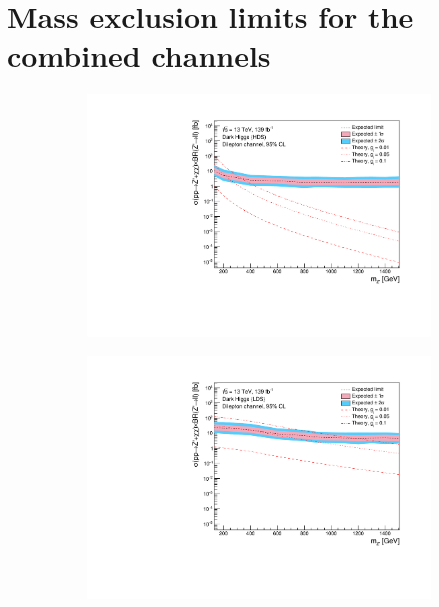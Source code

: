 \documentclass[12pt, a4paper]{book}
\begin{document}
\section{Mass exclusion limits for the combined channels}
\begin{figure}[!ht]
	\centering
	\begin{subfigure}[b]{0.49\textwidth}
      \centering
      \includegraphics[width=1\textwidth]{Limits/DH_HDS/mass_exclusion_comb.pdf}
   \end{subfigure}
   \hfill
   \begin{subfigure}[b]{0.49\textwidth}
      \centering
      \includegraphics[width=1\textwidth]{Limits/DH_LDS/mass_exclusion_comb.pdf}
   \end{subfigure}

\end{figure}
\end{document}
